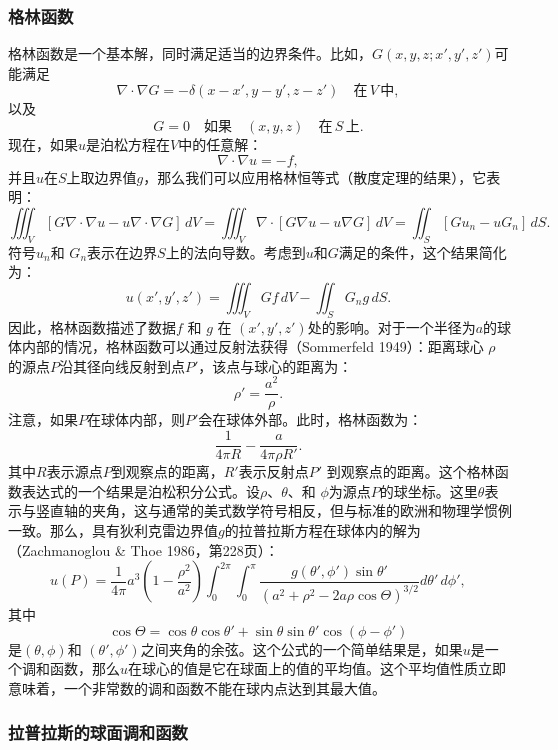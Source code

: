\subsubsection{格林函数}  
格林函数是一个基本解，同时满足适当的边界条件。比如，\( G(x,y,z;x',y',z') \)可能满足  
\[
\nabla \cdot \nabla G = -\delta (x - x', y - y', z - z') \quad \text{在} \, V \, \text{中},~
\]
以及  
\[
G = 0 \quad \text{如果} \quad (x, y, z) \quad \text{在} \, S \, \text{上}.~
\]
现在，如果\( u \)是泊松方程在\( V \)中的任意解：
\[
\nabla \cdot \nabla u = -f,~
\]
并且\( u \)在\( S \)上取边界值\( g \)，那么我们可以应用格林恒等式（散度定理的结果），它表明：
\[
\iiint_V \left[ G \nabla \cdot \nabla u - u \nabla \cdot \nabla G \right] \, dV = \iiint_V \nabla \cdot \left[ G \nabla u - u \nabla G \right] \, dV = \iint_S \left[ G u_n - u G_n \right] \, dS.~
\]
符号\( u_n \)和 \( G_n \)表示在边界\( S \)上的法向导数。考虑到\( u \)和\( G \)满足的条件，这个结果简化为：
\[
u(x',y',z') = \iiint_V Gf \, dV - \iint_S G_n g \, dS.~
\]
因此，格林函数描述了数据\( f \) 和 \( g \) 在 \( (x', y', z') \)处的影响。对于一个半径为\( a \)的球体内部的情况，格林函数可以通过反射法获得（Sommerfeld 1949）：距离球心 \( \rho \) 的源点\( P \)沿其径向线反射到点\( P' \)，该点与球心的距离为：
\[
\rho' = \frac{a^2}{\rho}.~
\]
注意，如果\( P \)在球体内部，则\( P' \)会在球体外部。此时，格林函数为：
\[
\frac{1}{4\pi R} - \frac{a}{4\pi \rho R'}.~
\]
其中\( R \)表示源点\( P \)到观察点的距离，\( R' \)表示反射点\( P' \) 到观察点的距离。这个格林函数表达式的一个结果是泊松积分公式。设\( \rho \)、\( \theta \)、和 \( \phi \)为源点\( P \)的球坐标。这里\( \theta \)表示与竖直轴的夹角，这与通常的美式数学符号相反，但与标准的欧洲和物理学惯例一致。那么，具有狄利克雷边界值\( g \)的拉普拉斯方程在球体内的解为（Zachmanoglou & Thoe 1986，第228页）：
\[
u(P) = \frac{1}{4\pi} a^3 \left( 1 - \frac{\rho^2}{a^2} \right) \int_0^{2\pi} \int_0^\pi \frac{g(\theta', \phi') \sin \theta'}{\left( a^2 + \rho^2 - 2a \rho \cos \Theta \right)^{3/2}} d\theta' \, d\phi',~
\]
其中  
\[
\cos \Theta = \cos \theta \cos \theta' + \sin \theta \sin \theta' \cos(\phi - \phi')~
\]  
是\( (\theta, \phi) \)和 \( (\theta', \phi') \)之间夹角的余弦。这个公式的一个简单结果是，如果\( u \)是一个调和函数，那么\( u \)在球心的值是它在球面上的值的平均值。这个平均值性质立即意味着，一个非常数的调和函数不能在球内点达到其最大值。
\subsubsection{拉普拉斯的球面调和函数}